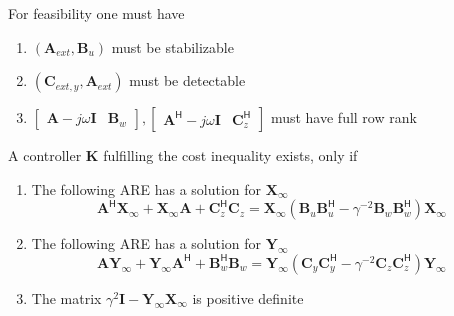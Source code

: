 For feasibility one must have
\begin{enumerate}
    \item $(\mathbf{A}_{ext}, \mathbf{B}_u)$ must be stabilizable
    \item $(\mathbf{C}_{ext, y},\mathbf{A}_{ext})$ must be detectable
    \item $\begin{bmatrix}\mathbf{A}-j\omega \mathbf{I}&\mathbf{B}_w\end{bmatrix},\begin{bmatrix}\mathbf{A}^{\mathsf{H}}-j\omega \mathbf{I}&\mathbf{C}_z^{\mathsf{H}}\end{bmatrix}$ must have full row rank
\end{enumerate}
\newpar{}
A controller $\mathbf{K}$ fulfilling the cost inequality exists, only if 
\begin{enumerate}
    \item The following ARE has a solution for $\mathbf{X}_{\infty}$
    \begin{equation*}
        \mathbf{A}^{\mathsf{H}}\mathbf{X}_{\infty}+\mathbf{X}_{\infty}\mathbf{A}+\mathbf{C}_{z}^{\mathsf{H}}\mathbf{C}_{z}=\mathbf{X}_{\infty}(\mathbf{B}_{u}\mathbf{B}_{u}^{\mathsf{H}}-\gamma^{-2}\mathbf{B}_{w}\mathbf{B}_{w}^{\mathsf{H}})\mathbf{X}_{\infty}
    \end{equation*}
    \item The following ARE has a solution for $\mathbf{Y}_{\infty}$
    \begin{equation*}
        \mathbf{A}\mathbf{Y}_\infty + \mathbf{Y}_\infty \mathbf{A}^{\mathsf{H}} + \mathbf{B}_w^{\mathsf{H}} \mathbf{B}_w = \mathbf{Y}_\infty (\mathbf{C}_y \mathbf{C}_y^{\mathsf{H}} - \gamma^{-2} \mathbf{C}_z \mathbf{C}_z^{\mathsf{H}}) \mathbf{Y}_\infty
    \end{equation*}
    \item The matrix $\gamma^2 \mathbf{I} - \mathbf{Y}_{\infty} \mathbf{X}_{\infty}$ is positive definite
\end{enumerate}

\newpar{}

